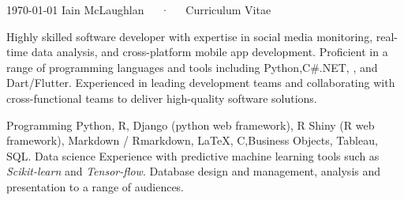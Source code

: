 \documentclass[11pt, a4paper]{awesome-cv}
\begin{document}
\makecvheader
\makecvfooter
  {\today}
  {Iain McLaughlan~~~·~~~Curriculum Vitae}
  {\thepage}

\begin{cvparagraph}
Highly skilled software developer with expertise in social media monitoring, real-time data analysis, and cross-platform mobile app development. Proficient in a range of programming languages and tools including Python,C#.NET, , and Dart/Flutter. Experienced in leading development teams and collaborating with cross-functional teams to deliver high-quality software solutions. 
\end{cvparagraph}


\begin{cvskills}
  \cvskill
    {Programming} %
    {Python, R, Django (python web framework), R Shiny (R web framework), Markdown / Rmarkdown, LaTeX, C,\newline Business Objects, Tableau, SQL.} %
  \cvskill
    {Data science}
    {Experience with predictive machine learning tools such as \textit{Scikit-learn} and \textit{Tensor-flow}. Database design and management, analysis and presentation to a range of audiences.}

\end{cvskills}


\end{document}
